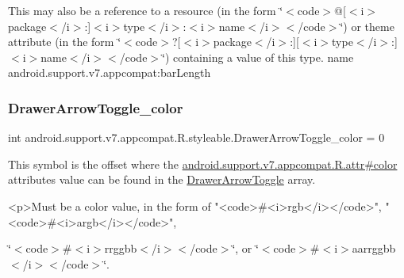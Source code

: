 This may also be a reference to a resource (in the form \char`\"{}$<$code$>$@\mbox{[}$<$i$>$package$<$/i$>$\+:\mbox{]}$<$i$>$type$<$/i$>$\+:$<$i$>$name$<$/i$>$$<$/code$>$\char`\"{}) or theme attribute (in the form \char`\"{}$<$code$>$?\mbox{[}$<$i$>$package$<$/i$>$\+:\mbox{]}\mbox{[}$<$i$>$type$<$/i$>$\+:\mbox{]}$<$i$>$name$<$/i$>$$<$/code$>$\char`\"{}) containing a value of this type.  name android.\+support.\+v7.\+appcompat\+:bar\+Length \mbox{\label{classandroid_1_1support_1_1v7_1_1appcompat_1_1R_1_1styleable_a9cc1908fc44ebedfcf125c65a0ff5e0b}} 
\subsubsection{\texorpdfstring{Drawer\+Arrow\+Toggle\+\_\+color}{DrawerArrowToggle\_color}}
{\footnotesize\ttfamily int android.\+support.\+v7.\+appcompat.\+R.\+styleable.\+Drawer\+Arrow\+Toggle\+\_\+color = 0\hspace{0.3cm}{\ttfamily [static]}}

This symbol is the offset where the \hyperlink{classandroid_1_1support_1_1v7_1_1appcompat_1_1R_1_1attr_a0711bae987f6ffaba425e74b5fc2af92}{android.\+support.\+v7.\+appcompat.\+R.\+attr\#color} attribute\textquotesingle{}s value can be found in the \hyperlink{classandroid_1_1support_1_1v7_1_1appcompat_1_1R_1_1styleable_a7bd3ecc07eb763b454c40c0871959a35}{Drawer\+Arrow\+Toggle} array.

\begin{DoxyVerb}      <p>Must be a color value, in the form of "<code>#<i>rgb</i></code>", "<code>#<i>argb</i></code>",
\end{DoxyVerb}
 \char`\"{}$<$code$>$\#$<$i$>$rrggbb$<$/i$>$$<$/code$>$\char`\"{}, or \char`\"{}$<$code$>$\#$<$i$>$aarrggbb$<$/i$>$$<$/code$>$\char`\"{}. 

